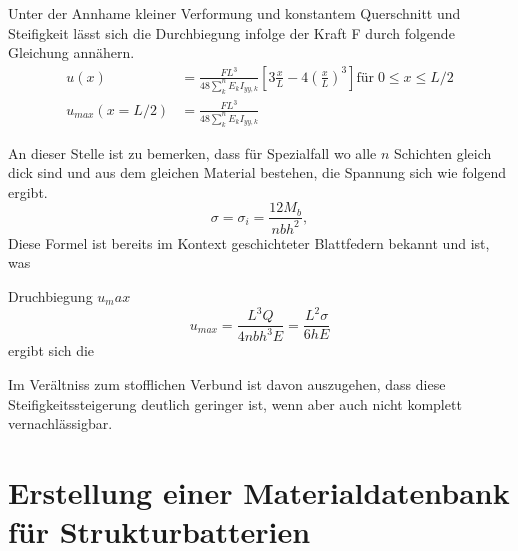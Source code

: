 Unter der Annhame kleiner Verformung und konstantem Querschnitt und Steifigkeit lässt sich die Durchbiegung infolge der Kraft F durch folgende Gleichung annähern.
\begin{align}
    u(x) &= \frac{F L^3}{48 \sum_{k}^{n} E_k I_{yy,k}} \left[ 3 \frac{x}{L} - 4\left(\frac{x}{L}\right)^3 \right] \text{für} \; 0 \leq x \leq L/2 \\
    u_{max} (x = L/2) &= \frac{FL^3}{48 \sum_{k}^{n} E_k I_{yy,k}} 
\end{align}



An dieser Stelle ist zu bemerken, dass für Spezialfall wo alle $n$ Schichten gleich dick sind und aus dem gleichen Material bestehen, die Spannung sich wie folgend ergibt.
\begin{equation}
    \sigma = \sigma_i = \frac{12 M_{b}}{n b h^2},
\end{equation}
Diese Formel ist bereits im Kontext geschichteter Blattfedern bekannt und ist, was 

Druchbiegung $u_max$
\begin{equation}
    u_{max} = \frac{L^3 Q}{4 n b h^3 E} = \frac{L^2 \sigma}{6 h E}
\end{equation}
ergibt sich die 


Im Verältniss zum stofflichen Verbund ist davon auszugehen, dass diese Steifigkeitssteigerung deutlich geringer ist, wenn aber auch nicht komplett vernachlässigbar.


\section{Erstellung einer Materialdatenbank für Strukturbatterien}